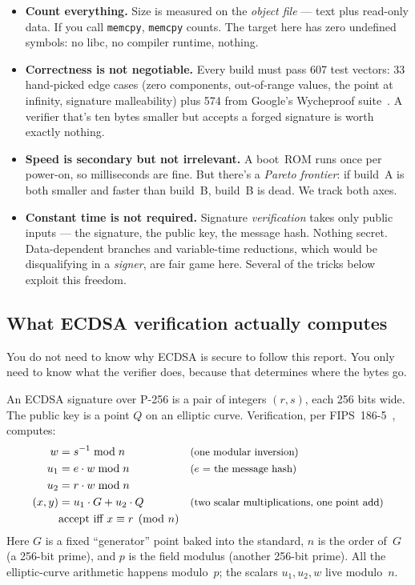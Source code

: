 \documentclass[11pt,a4paper]{article}
\begin{document}
\begin{itemize}
\item \textbf{Count everything.} Size is measured on the \emph{object
  file} --- text plus read-only data. If you call \texttt{memcpy},
  \texttt{memcpy} counts. The target here has zero undefined symbols:
  no libc, no compiler runtime, nothing.
\item \textbf{Correctness is not negotiable.} Every build must pass
  607 test vectors: 33 hand-picked edge cases (zero components,
  out-of-range values, the point at infinity, signature malleability)
  plus 574 from Google's Wycheproof suite~\cite{wycheproof}. A
  verifier that's ten bytes smaller but accepts a forged signature is
  worth exactly nothing.
\item \textbf{Speed is secondary but not irrelevant.} A boot~ROM
  runs once per power-on, so milliseconds are fine. But there's a
  \emph{Pareto frontier}: if build~A is both smaller and
  faster than build~B, build~B is dead. We track both axes.
\item \textbf{Constant time is not required.} Signature
  \emph{verification} takes only public inputs --- the signature, the
  public key, the message hash. Nothing secret. Data-dependent
  branches and variable-time reductions, which would be disqualifying
  in a \emph{signer}, are fair game here. Several of the tricks below
  exploit this freedom.
\end{itemize}

\subsection{What ECDSA verification actually computes}
\label{sec:ecdsa}

You do not need to know why ECDSA is secure to follow this report.
You only need to know what the verifier does, because that
determines where the bytes go.

An ECDSA signature over P-256 is a pair of integers $(r, s)$, each
256 bits wide. The public key is a point $Q$ on an elliptic curve.
Verification, per FIPS~186-5~\cite{fips186}, computes:
\begin{align*}
  w   &= s^{-1} \bmod n            &&\text{\small (one modular inversion)}\\
  u_1 &= e \cdot w \bmod n         &&\text{\small ($e$ = the message hash)}\\
  u_2 &= r \cdot w \bmod n         \\
  (x, y) &= u_1 \cdot G + u_2 \cdot Q  &&\text{\small (two scalar multiplications, one point add)}\\
  &\text{accept iff } x \equiv r \pmod{n}
\end{align*}
Here $G$ is a fixed ``generator'' point baked into the standard, $n$
is the order of~$G$ (a 256-bit prime), and $p$ is the field modulus
(another 256-bit prime). All the elliptic-curve arithmetic happens
modulo~$p$; the scalars $u_1, u_2, w$ live modulo~$n$.
\end{document}
